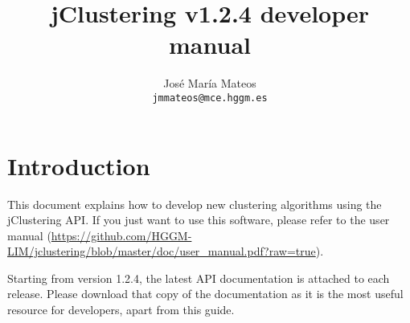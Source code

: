 \documentclass[11pt]{article} %
\title{jClustering v1.2.4 developer manual}
\author{José María Mateos \\ \texttt{jmmateos@mce.hggm.es}}
\begin{document}
\maketitle

\tableofcontents

\section{Introduction}

This document explains how to develop new clustering algorithms using the jClustering API. If you just want to use this software, please refer to the user manual (\url{https://github.com/HGGM-LIM/jclustering/blob/master/doc/user_manual.pdf?raw=true}).

Starting from version 1.2.4, the latest API documentation is attached to each release. Please download that copy of the documentation as it is the most useful resource for developers, apart from this guide.
\end{document}
